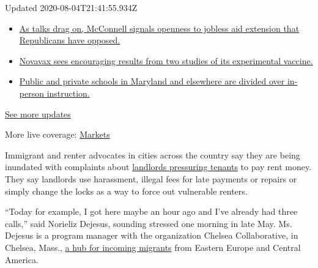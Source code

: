 Updated 2020-08-04T21:41:55.934Z

\begin{itemize}
\tightlist
\item
  \href{https://www.nytimes3xbfgragh.onion/2020/08/04/world/coronavirus-cases.html?action=click\&pgtype=Article\&state=default\&region=MAIN_CONTENT_1\&context=storylines_live_updates\#link-2daa96b5}{As
  talks drag on, McConnell signals openness to jobless aid extension
  that Republicans have opposed.}
\item
  \href{https://www.nytimes3xbfgragh.onion/2020/08/04/world/coronavirus-cases.html?action=click\&pgtype=Article\&state=default\&region=MAIN_CONTENT_1\&context=storylines_live_updates\#link-1228a480}{Novavax
  sees encouraging results from two studies of its experimental
  vaccine.}
\item
  \href{https://www.nytimes3xbfgragh.onion/2020/08/04/world/coronavirus-cases.html?action=click\&pgtype=Article\&state=default\&region=MAIN_CONTENT_1\&context=storylines_live_updates\#link-4825b93}{Public
  and private schools in Maryland and elsewhere are divided over
  in-person instruction.}
\end{itemize}

\href{https://www.nytimes3xbfgragh.onion/2020/08/04/world/coronavirus-cases.html?action=click\&pgtype=Article\&state=default\&region=MAIN_CONTENT_1\&context=storylines_live_updates}{See
more updates}

More live coverage:
\href{https://www.nytimes3xbfgragh.onion/live/2020/08/04/business/stock-market-today-coronavirus?action=click\&pgtype=Article\&state=default\&region=MAIN_CONTENT_1\&context=storylines_live_updates}{Markets}

Immigrant and renter advocates in cities across the country say they are
being inundated with complaints about
\href{https://www.nytimes3xbfgragh.onion/2020/07/23/business/evictions-moratorium-cares-act.html}{landlords
pressuring tenants} to pay rent money. They say landlords use
harassment, illegal fees for late payments or repairs or simply change
the locks as a way to force out vulnerable renters.

``Today for example, I got here maybe an hour ago and I've already had
three calls,'' said Norieliz Dejesus, sounding stressed one morning in
late May. Ms. Dejesus is a program manager with the organization Chelsea
Collaborative, in Chelsea, Mass.,
\href{https://www.nytimes3xbfgragh.onion/2020/04/25/us/coronavirus-chelsea-massachusetts.html}{a
hub for incoming migrants} from Eastern Europe and Central America.

